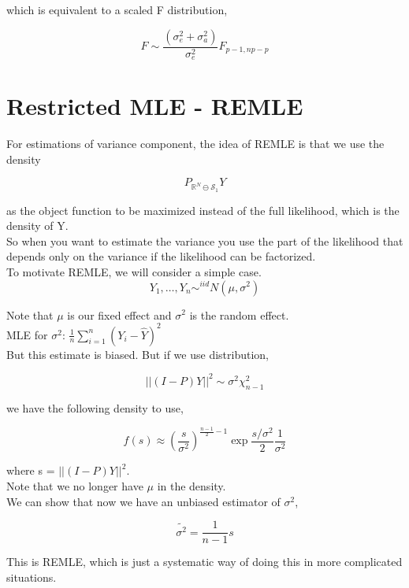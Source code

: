 \documentclass[11pt,fleqn]{book} %
\begin{document}
which is equivalent to a scaled F distribution, 


		$$ F \sim  \frac{(\sigma_e^2 + \sigma_a^2)}{\sigma^2_e} F_{p-1, np - p} $$



\section{Restricted MLE - REMLE}


For estimations of variance component, the idea of REMLE is that we use the density 

		$$ P_{\mathbb{R}^N \ominus \mathcal{S}_1} Y$$

as the object function to be maximized instead of the full likelihood, which is the density of Y. \\

So when you want to estimate the variance you use the part of the likelihood that depends only on the variance if the likelihood can be factorized. \\

To motivate REMLE, we will consider a simple case. \\


		$$Y_1, \dots, Y_n \sim^{iid} N(\mu, \sigma^2) $$

Note that $\mu$ is our fixed effect and $\sigma^2$ is the random effect. \\

MLE for $\sigma^2$: $\frac{1}{n} \sum^n_{i =1} (Y_i - \hat{Y})^2$\\

But this estimate is biased. But if we use distribution, 

		$$ ||(I - P)Y ||^2 \sim \sigma^2 \chi^2_{n-1}$$


we have the following density to use, 


		$$f(s) \approx (\frac{s}{\sigma^2})^{\frac{n-1}{2} - 1} \exp{\frac{s/\sigma^2}{2}} \frac{1}{\sigma^2} $$

where s = $||(I - P)Y ||^2 $.\\

Note that we no longer have $\mu$ in the density. \\

We can show that now we have an unbiased estimator of $\sigma^2$, 

		$$\tilde{\sigma^2} = \frac{1}{n-1}s $$

This is REMLE, which is just a systematic way of doing this in more complicated situations. \\
\end{document}
